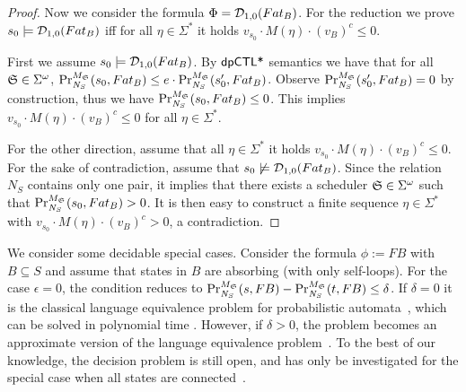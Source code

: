 \begin{proof}
Now we consider the formula  $\Phi = \dpriv{1}{0} (F at_B)$. For the reduction we prove $s_0\models \dpriv{1}{0} (F at_B)$ iff for all $\eta\in\Sigma^*$ it holds $v_{s_0}\cdot M(\eta)\cdot (v_B)^c \leq 0$.

First we assume $s_0\models \dpriv{1}{0} (F at_B)$. By $\dpCTLstar$ semantics we have that for all $\scheduler{S}\in\Sigma^\omega$,
$\myPr{s_0}{M_{\scheduler{S}}}{\neighbor{S}}{F at_B} \leq
  e \cdot
  \myPr{s_0'}{M_{\scheduler{S}}}{\neighbor{S}}{F at_B}$. Observe $\myPr{s_0'}{M_{\scheduler{S}}}{\neighbor{S}}{F at_B}=0$ by construction, thus we have
$\myPr{s_0}{M_{\scheduler{S}}}{\neighbor{S}}{F at_B} \leq
 0$. This implies  $v_{s_0}\cdot M(\eta)\cdot (v_B)^c \leq 0$ for all $\eta\in\Sigma^*$.

 For the other direction, assume that all $\eta\in\Sigma^*$ it holds $v_{s_0}\cdot M(\eta)\cdot (v_B)^c \leq 0$. For the sake of contradiction, assume that $s_0\not\models \dpriv{1}{0} (F at_B)$. Since the relation $N_S$ contains only one pair, it implies that there exists a scheduler $\scheduler{S}\in\Sigma^\omega$ such that $\myPr{s_0}{M_{\scheduler{S}}}{\neighbor{S}}{F at_B} >0$. It is then easy to construct a finite sequence $\eta\in\Sigma^*$ with  $v_{s_0}\cdot M(\eta)\cdot (v_B)^c > 0$, a contradiction.
\end{proof}

We consider some decidable special cases. Consider the formula $\phi:=F B$ with $B\subseteq S$ and assume that states in $B$ are absorbing (with only self-loops). For the case $\epsilon=0$, the condition reduces to
$\myPr{s}{M_{\scheduler{S}}}{\neighbor{S}}{F B} -
\myPr{t}{M_{\scheduler{S}}}{\neighbor{S}}{F B}\le \delta$. If $\delta=0$ it is the classical language equivalence problem for probabilistic automata~\cite{Rabin63}, which can be solved in polynomial time \cite{Tzeng92}. However, if $\delta>0$, the problem
becomes an approximate version of the language equivalence problem~\cite{Tzeng92}. To the best of our knowledge, the decision problem is still open, and has only be investigated for the special case when all states are connected~\cite{Tzeng92}.

